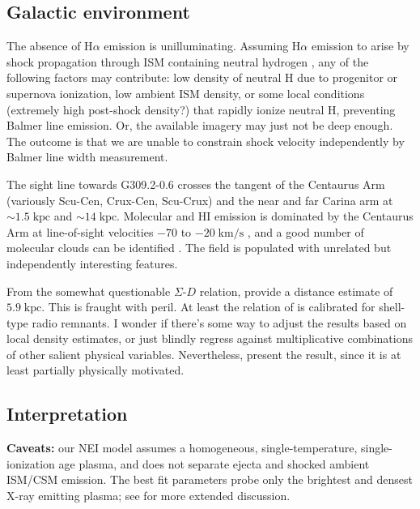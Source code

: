 \documentclass[preprint2,tighten,trackchanges]{aastex6}
\newcommand*{\mt}{\mathrm}
\newcommand*{\unit}[1]{\;\mt{#1}}  %
\newcommand*{\abt}{\mathord{\sim}} %
\begin{document}
\subsection{Galactic environment}

The absence of H$\alpha$ emission is unilluminating.
Assuming H$\alpha$ emission to arise by shock propagation through ISM
containing neutral hydrogen \citep{chevalier1978},  %
any of the following factors may contribute: low density of neutral H due to
progenitor or supernova ionization, low ambient ISM density, or some local
conditions (extremely high post-shock density?) that rapidly ionize neutral H,
preventing Balmer line emission.
Or, the available imagery may just not be deep enough.
The outcome is that we are unable to constrain shock velocity independently by
Balmer line width measurement.

The sight line towards G309.2-0.6 crosses the tangent of the Centaurus Arm
(variously Scu-Cen, Crux-Cen, Scu-Crux) and the near and far Carina arm at
$\abt 1.5 \unit{kpc}$ and $\abt 14 \unit{kpc}$.  Molecular and HI emission is
dominated by the Centaurus Arm at line-of-sight velocities $-70$ to
$-20 \unit{km/s}$ \citep[e.g.,][Figure 4]{dame2011}, and a good number of
molecular clouds can be identified \citep{rice2016}.  The field is populated
with unrelated but independently interesting features.

From the somewhat questionable $\Sigma$-$D$ relation, \citet{pavlovic2014}
provide a distance estimate of $5.9 \unit{kpc}$.
This is fraught with peril.
At least the relation of \citet{pavlovic2014} is calibrated for shell-type
radio remnants.
I wonder if there's some way to adjust the results based on local density
estimates, or just blindly regress against multiplicative combinations of other
salient physical variables.
Nevertheless, present the result, since it is at least partially physically
motivated.

\subsection{Interpretation}

\textbf{Caveats:} our NEI model assumes a homogeneous, single-temperature,
single-ionization age plasma, and does not separate ejecta and shocked ambient
ISM/CSM emission.
The best fit parameters probe only the brightest and densest X-ray emitting
plasma; see \citet{rakowski2006-g337} for more extended discussion.
\end{document}
